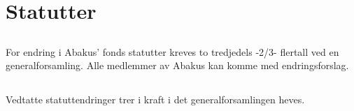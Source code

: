 \section{Statutter}

\subsection{}
For endring i Abakus’ fonds statutter kreves to tredjedels -2/3- flertall ved en
generalforsamling. Alle medlemmer av Abakus kan komme med endringsforslag.

\subsection{}
Vedtatte statuttendringer trer i kraft i det generalforsamlingen heves.
